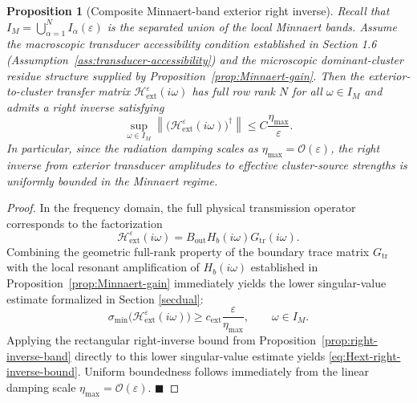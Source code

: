 \documentclass[11pt,a4paper]{article}
\numberwithin{equation}{section}
\newtheorem{proposition}[theorem]{Proposition}
\newcommand{\norm}[1]{\left\lVert #1 \right\rVert}
\begin{document}
\begin{proposition}[Composite Minnaert-band exterior right inverse]
\label{prop:Minnaert-right-inverse}
Recall that $I_M=\bigcup_{\alpha=1}^N I_\alpha(\varepsilon)$ is the separated union of the local Minnaert bands. Assume the macroscopic transducer accessibility condition established in Section 1.6 (Assumption~\ref{ass:transducer-accessibility}) and the microscopic dominant-cluster residue structure supplied by Proposition~\ref{prop:Minnaert-gain}. Then the exterior-to-cluster transfer matrix $\mathcal{H}_{\mathrm{ext}}^\varepsilon(i\omega)$ has full row rank $N$ for all $\omega\in I_M$ and admits a right inverse satisfying
\begin{equation}
\label{eq:Hext-right-inverse-bound}
  \sup_{\omega\in I_M} \norm{\bigl(\mathcal{H}_{\mathrm{ext}}^\varepsilon(i\omega)\bigr)^\dagger} \le C\frac{\eta_{\max}}{\varepsilon}.
\end{equation}
In particular, since the radiation damping scales as $\eta_{\max}=\mathcal{O}(\varepsilon)$, the right inverse from exterior transducer amplitudes to effective cluster-source strengths is uniformly bounded in the Minnaert regime.
\end{proposition}
\begin{proof}
In the frequency domain, the full physical transmission operator corresponds to the factorization 
$$\mathcal{H}_{\mathrm{ext}}^\varepsilon(i\omega) = B_{\mathrm{out}} H_b(i\omega) G_{\mathrm{tr}}(i\omega).$$ 
Combining the geometric full-rank property of the boundary trace matrix $G_{\mathrm{tr}}$ with the local resonant amplification of $H_b(i\omega)$ established in Proposition~\ref{prop:Minnaert-gain} immediately yields the lower singular-value estimate formalized in Section \ref{secdual}:
\[
  \sigma_{\min}\bigl(\mathcal{H}_{\mathrm{ext}}^\varepsilon(i\omega)\bigr) \ge c_{\mathrm{ext}}\frac{\varepsilon}{\eta_{\max}}, \qquad \omega\in I_M.
\]
Applying the rectangular right-inverse bound from Proposition~\ref{prop:right-inverse-band} directly to this lower singular-value estimate yields \eqref{eq:Hext-right-inverse-bound}. Uniform boundedness follows immediately from the linear damping scale $\eta_{\max}=\mathcal{O}(\varepsilon)$. \hfill $\blacksquare$
\end{proof}
\end{document}
